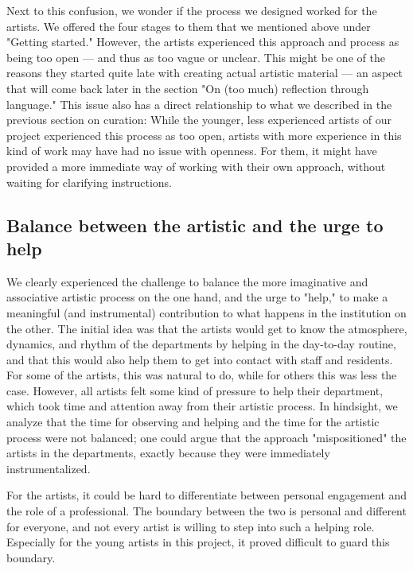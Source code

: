 \documentclass[authordate, empirical]{jote-new-article}
\begin{document}
{	Next to this confusion, we wonder if the process we designed worked for the artists. We offered the four stages to them that we mentioned above under "Getting started." However, the artists experienced this approach and process as being too open --- and thus as too vague or unclear. This might be one of the reasons they started quite late with creating actual artistic material --- an aspect that will come back later in the section "On (too much) reflection through language." This issue also has a direct relationship to what we described in the previous section on curation: While the younger, less experienced artists of our project experienced this process as too open, artists with more experience in this kind of work may have had no issue with openness. For them, it might have provided a more immediate way of working with their own approach, without waiting for clarifying instructions.







	\subsection{Balance between the artistic and the urge to help}







	We clearly experienced the challenge to balance the more imaginative and associative artistic process on the one hand, and the urge to "help," to make a meaningful (and instrumental) contribution to what happens in the institution on the other. The initial idea was that the artists would get to know the atmosphere, dynamics, and rhythm of the departments by helping in the day-to-day routine, and that this would also help them to get into contact with staff and residents. For some of the artists, this was natural to do, while for others this was less the case. However, all artists felt some kind of pressure to help their department, which took time and attention away from their artistic process. In hindsight, we analyze that the time for observing and helping and the time for the artistic process were not balanced; one could argue that the approach "mispositioned" the artists in the departments, exactly because they were immediately instrumentalized.







	For the artists, it could be hard to differentiate between personal engagement and the role of a professional. The boundary between the two is personal and different for everyone, and not every artist is willing to step into such a helping role. Especially for the young artists in this project, it proved difficult to guard this boundary.







}
\end{document}
